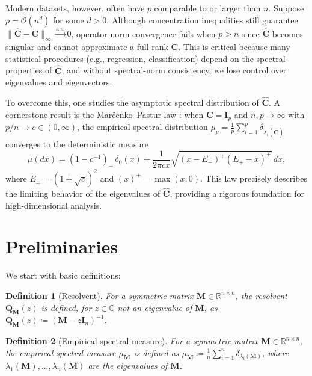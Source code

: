 \documentclass[12pt]{article}
\newtheorem{definition}{Definition}
\begin{document}
Modern datasets, however, often have $p$ comparable to or larger than $n$. Suppose $p = \mathcal{O}(n^d)$ for some $d > 0$. Although concentration inequalities still guarantee $\|\hat{\mathbf{C}} - \mathbf{C}\|_{\infty} \xrightarrow{\mathrm{a.s.}} 0$, operator-norm convergence fails when $p > n$ since $\hat{\mathbf{C}}$ becomes singular and cannot approximate a full-rank $\mathbf{C}$. This is critical because many statistical procedures (e.g., regression, classification) depend on the spectral properties of $\hat{\mathbf{C}}$, and without spectral-norm consistency, we lose control over eigenvalues and eigenvectors.

To overcome this, one studies the asymptotic spectral distribution of $\hat{\mathbf{C}}$. A cornerstone result is the Mar\v{c}enko--Pastur law \citep{Marcenko1967}: when $\mathbf{C} = \mathbf{I}_p$ and $n, p \to \infty$ with $p/n \to c \in (0, \infty)$, the empirical spectral distribution $\mu_p = \frac{1}{p} \sum_{i=1}^p \delta_{\lambda_i(\hat{\mathbf{C}})}$ converges to the deterministic measure  
$$
\mu(dx) = (1 - c^{-1})_+\,\delta_0(x) + \frac{1}{2\pi c x} \sqrt{(x - E_-)^+ (E_+ - x)^+}\,dx,
$$
where $E_{\pm} = (1 \pm \sqrt{c})^2$ and $(x)^+ = \max(x, 0)$. This law precisely describes the limiting behavior of the eigenvalues of $\hat{\mathbf{C}}$, providing a rigorous foundation for high-dimensional analysis.

\section{Preliminaries}
We start with basic definitions:

\begin{definition}[Resolvent]
For a symmetric matrix $\mathbf{M} \in \mathbb{R}^{n \times n}$, the resolvent $\mathbf{Q}_\mathbf{M}(z)$ is defined, for $z \in \mathbb{C}$ not an eigenvalue of $\mathbf{M}$, as $\mathbf{Q}_\mathbf{M}(z) \coloneqq (\mathbf{M} - z\mathbf{I}_n)^{-1}$.
\end{definition}

\begin{definition}[Empirical spectral measure]
For a symmetric matrix $\mathbf{M} \in \mathbb{R}^{n \times n}$, the empirical spectral measure $\mu_\mathbf{M}$ is defined as $\mu_\mathbf{M} \coloneqq \frac{1}{n} \sum_{i=1}^{n} \delta_{\lambda_i(\mathbf{M})}$, where $\lambda_1(\mathbf{M}), \ldots, \lambda_n(\mathbf{M})$ are the eigenvalues of $\mathbf{M}$.
\end{definition}
\end{document}
